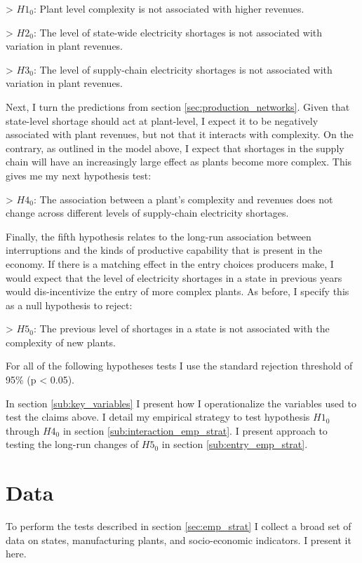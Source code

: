 \documentclass[11pt]{article}
\begin{document}
> $H1_0$: Plant level complexity is not associated with higher revenues.

> $H2_0$: The level of state-wide electricity shortages is not associated with variation in plant revenues.

> $H3_0$: The level of supply-chain electricity shortages is not associated with variation in plant revenues.

Next, I turn the predictions from section \ref{sec:production_networks}. Given that state-level shortage should act at plant-level, I expect it to be negatively associated with plant revenues, but not that it interacts with complexity. On the contrary, as outlined in the model above, I expect that shortages in the supply chain will have an increasingly large effect as plants become more complex. This gives me my next hypothesis test:

> $H4_0$: The association between a plant's complexity and revenues does not change across different levels of supply-chain electricity shortages.

Finally, the fifth hypothesis relates to the long-run association between interruptions and the kinds of productive capability that is present in the economy. If there is a matching effect in the entry choices producers make, I would expect that the level of electricity shortages in a state in previous years would dis-incentivize the entry of more complex plants. As before, I specify this as a null hypothesis to reject:

> $H5_{0}$: The previous level of shortages in a state is not associated with the complexity of new plants.

For all of the following hypotheses tests I use the standard rejection threshold of 95\% (p < 0.05).

In section \ref{sub:key_variables} I present how I operationalize the variables used to test the claims above. I detail my empirical strategy to test hypothesis $H1_0$ through $H4_0$ in section \ref{sub:interaction_emp_strat}. I present approach to testing the  long-run changes of $H5_0$ in section \ref{sub:entry_emp_strat}.

 \newpage

\section{Data}%
\label{sub:data}

To perform the tests described in section \ref{sec:emp_strat} I collect a broad set of data on states, manufacturing plants, and socio-economic indicators. I present it here.
\end{document}
